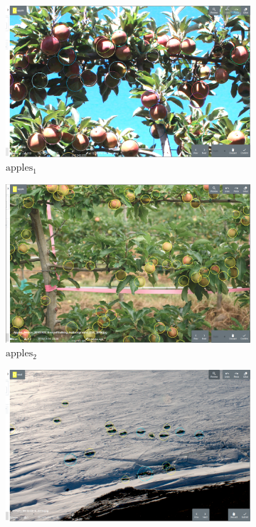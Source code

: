 \begin{figure}[htbp]
\begin{subfigure}[t]{0.24\linewidth}
  \includegraphics[width=1.0\linewidth]{figures/annotation/screenshots/apples_big2.png}
  \caption{$\mathrm{apples_1}$}
\end{subfigure}%
\begin{subfigure}[t]{0.24\linewidth}
  \includegraphics[width=1.0\linewidth]{figures/annotation/screenshots/apples2.png}
  \caption{$\mathrm{apples_2}$}
\end{subfigure}%
 \begin{subfigure}[t]{0.24\linewidth}
  \includegraphics[width=1.0\linewidth]{figures/annotation/screenshots/seals_small2.png}

\end{subfigure}
\end{figure}
